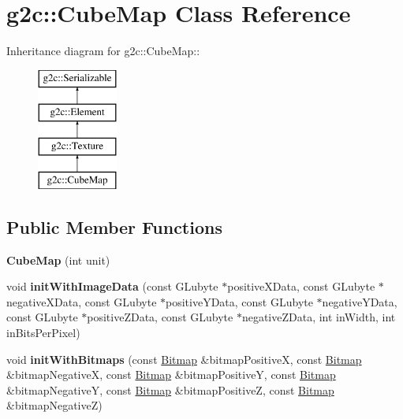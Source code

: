 \hypertarget{classg2c_1_1_cube_map}{
\section{g2c::CubeMap Class Reference}
\label{classg2c_1_1_cube_map}
}
Inheritance diagram for g2c::CubeMap::\begin{figure}[H]
\begin{center}
\leavevmode
\includegraphics[height=4cm]{classg2c_1_1_cube_map}
\end{center}
\end{figure}
\subsection*{Public Member Functions}
\begin{DoxyCompactItemize}
\item 
\hypertarget{classg2c_1_1_cube_map_a8ccdab98236e6d1a25a352edc4b84c40}{
{\bfseries CubeMap} (int unit)}
\label{classg2c_1_1_cube_map_a8ccdab98236e6d1a25a352edc4b84c40}

\item 
\hypertarget{classg2c_1_1_cube_map_aaac886cf9fbbdd8baf37998017e9168a}{
void {\bfseries initWithImageData} (const GLubyte $\ast$positiveXData, const GLubyte $\ast$negativeXData, const GLubyte $\ast$positiveYData, const GLubyte $\ast$negativeYData, const GLubyte $\ast$positiveZData, const GLubyte $\ast$negativeZData, int inWidth, int inBitsPerPixel)}
\label{classg2c_1_1_cube_map_aaac886cf9fbbdd8baf37998017e9168a}

\item 
\hypertarget{classg2c_1_1_cube_map_ac771220017a469ab3cb5fb388f2d4c29}{
void {\bfseries initWithBitmaps} (const \hyperlink{classg2c_1_1_bitmap}{Bitmap} \&bitmapPositiveX, const \hyperlink{classg2c_1_1_bitmap}{Bitmap} \&bitmapNegativeX, const \hyperlink{classg2c_1_1_bitmap}{Bitmap} \&bitmapPositiveY, const \hyperlink{classg2c_1_1_bitmap}{Bitmap} \&bitmapNegativeY, const \hyperlink{classg2c_1_1_bitmap}{Bitmap} \&bitmapPositiveZ, const \hyperlink{classg2c_1_1_bitmap}{Bitmap} \&bitmapNegativeZ)}
\label{classg2c_1_1_cube_map_ac771220017a469ab3cb5fb388f2d4c29}

\end{DoxyCompactItemize}
